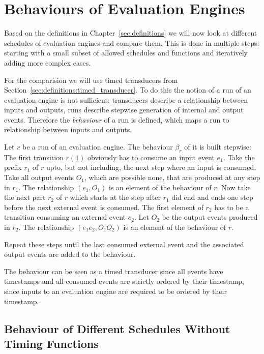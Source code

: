 \chapter{Behaviours of Evaluation Engines}
\label{sec:behaviours}

Based on the definitions in Chapter~\ref{sec:definitions} we will now look at different schedules of evaluation engines and compare them.
This is done in multiple steps: starting with a small subset of allowed schedules and functions and iteratively adding more complex cases.

For the comparision we will use timed transducers from Section~\ref{sec:definitions:timed_transducer}.
To do this the notion of a run of an evaluation engine is not sufficient: transducers describe a relationship between inputs and outputs, runs describe stepwise generation of internal and output events.
Therefore the \emph{behaviour} of a run is defined, which maps a run to relationship between inputs and outputs.

\begin{definition}[name = Behaviour of a Run]\label{def:behaviour_run}
  Let \(r\) be a run of an evaluation engine.
  The behaviour \(\beta_r\) of it is built stepwise:
  The first transition \(r(1)\) obviously has to consume an input event \(e_1\).
  Take the prefix \(r_1\) of \(r\) upto, but not including, the next step where an input is consumed.
  Take all output events \(O_1\), which are possible none, that are produced at any step in \(r_1\).
  The relationship \((e_1,O_1)\) is an element of the behaviour of \(r\).
  Now take the next part \(r_2\) of \(r\) which starts at the step after \(r_1\) did end and ends one step before the next external event is consumed.
  The first element of \(r_2\) has to be a transition consuming an external event \(e_2\).
  Let \(O_2\) be the output events produced in \(r_2\).
  The relationship \((e_1e_2, O_1O_2)\) is an element of the behaviour of \(r\).

  Repeat these steps until the last consumed external event and the associated output events are added to the behaviour.
\end{definition}

The behaviour can be seen as a timed transducer since all events have timestamps and all consumed events are strictly ordered by their timestamp, since inputs to an evaluation engine are required to be ordered by their timestamp.

\section{Behaviour of Different Schedules Without Timing Functions}
\label{sec:behaviours:without_timing}

